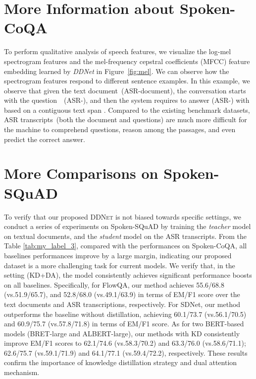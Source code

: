 \documentclass[11pt]{article}
\begin{document}
\section{More Information about Spoken-CoQA}
\label{supp:morecompare-scoqa}
To perform qualitative analysis of speech features, we visualize the log-mel spectrogram features and the mel-frequency cepstral coefficients (MFCC) feature embedding learned by \textit{DDNet} in Figure~\ref{fig:mel}. We can observe how the spectrogram features respond to different sentence examples. In this example, we observe that given the text document~(ASR-document), the conversation starts with the question~~(ASR-), and then the system requires to answer  (ASR-) with  based on a contiguous text span . Compared to the existing benchmark datasets, ASR transcripts~(both the document and questions) are much more difficult for the machine to comprehend questions, reason among the passages, and even predict the correct answer.

\section{More Comparisons on Spoken-SQuAD}
\label{supp:morecompare-squad}
To verify that our proposed \textsc{DDNet} is not biased towards specific settings, we conduct a series of experiments on Spoken-SQuAD \cite{li2018spoken} by training the \textit{teacher} model on textual documents, and the \textit{student} model on the ASR transcripts. From the Table \ref{tab:my_label_3}, compared with the performances on Spoken-CoQA, all baselines performances improve by a large margin, indicating our proposed dataset is a more challenging task for current models. We verify that, in the setting (KD+DA), the model consistently achieves significant performance boosts on all baselines. Specifically, for FlowQA, our method achieves 55.6/68.8 (vs.51.9/65.7), and 52.8/68.0 (vs.49.1/63.9) in terms of EM/F1 score over the text documents and ASR transcriptions, respectively. For SDNet, our method outperforms the baseline without distillation, achieving 60.1/73.7 (vs.56.1/70.5) and 60.9/75.7 (vs.57.8/71.8) in terms of EM/F1 score. As for two BERT-based models (BRET-large and ALBERT-large), our methods with KD consistently improve EM/F1 scores to 62.1/74.6 (vs.58.3/70.2) and 63.3/76.0 (vs.58.6/71.1); 62.6/75.7 (vs.59.1/71.9) and 64.1/77.1 (vs.59.4/72.2), respectively. These results confirm the importance of knowledge distillation strategy and dual attention mechanism.
\end{document}
